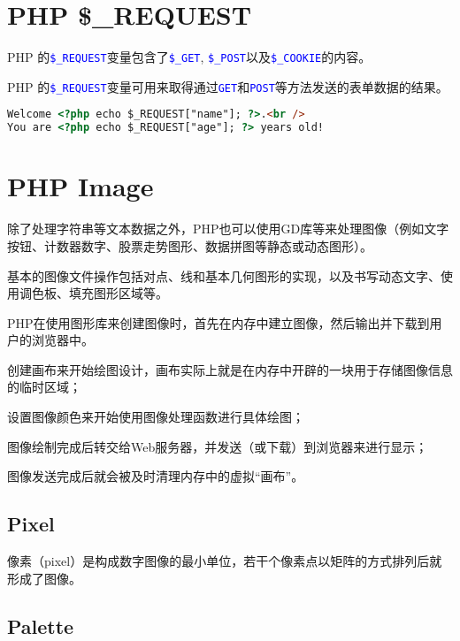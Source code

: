 \chapter{PHP \$\_REQUEST}


PHP 的\textcolor{Blue}{\texttt{\$\_REQUEST}}变量包含了\textcolor{Blue}{\texttt{\$\_GET}}, \textcolor{Blue}{\texttt{\$\_POST}}以及\textcolor{Blue}{\texttt{\$\_COOKIE}}的内容。

PHP 的\textcolor{Blue}{\texttt{\$\_REQUEST}}变量可用来取得通过\textcolor{Blue}{\texttt{GET}}和\textcolor{Blue}{\texttt{POST}}等方法发送的表单数据的结果。



\begin{lstlisting}[language=HTML]
Welcome <?php echo $_REQUEST["name"]; ?>.<br />
You are <?php echo $_REQUEST["age"]; ?> years old!
\end{lstlisting}


\chapter{PHP Image}

除了处理字符串等文本数据之外，PHP也可以使用GD库等来处理图像（例如文字按钮、计数器数字、股票走势图形、数据拼图等静态或动态图形）。

基本的图像文件操作包括对点、线和基本几何图形的实现，以及书写动态文字、使用调色板、填充图形区域等。



PHP在使用图形库来创建图像时，首先在内存中建立图像，然后输出并下载到用户的浏览器中。

\begin{compactenum}
\item 创建画布来开始绘图设计，画布实际上就是在内存中开辟的一块用于存储图像信息的临时区域；
\item 设置图像颜色来开始使用图像处理函数进行具体绘图；
\item 图像绘制完成后转交给Web服务器，并发送（或下载）到浏览器来进行显示；
\item 图像发送完成后就会被及时清理内存中的虚拟“画布”。
\end{compactenum}


\section{Pixel}


像素（pixel）是构成数字图像的最小单位，若干个像素点以矩阵的方式排列后就形成了图像。

\section{Palette}

